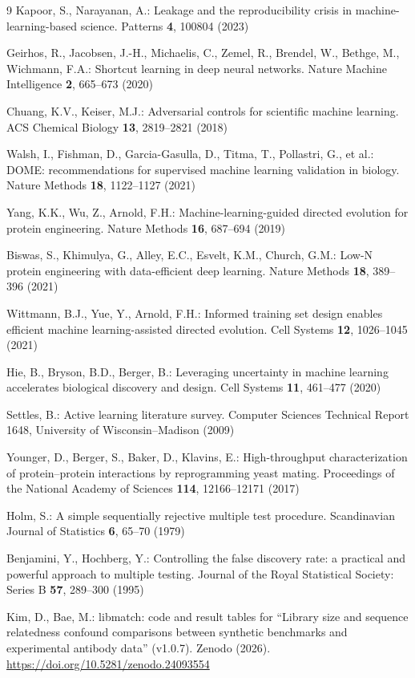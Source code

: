 \documentclass[pdflatex,sn-nature]{sn-jnl}
\theoremstyle{thmstyleone}
\theoremstyle{thmstyletwo}
\theoremstyle{thmstylethree}
\begin{document}
\begin{thebibliography}{9}
Kapoor, S., Narayanan, A.: Leakage and the reproducibility crisis in
machine-learning-based science. Patterns \textbf{4}, 100804 (2023)

Geirhos, R., Jacobsen, J.-H., Michaelis, C., Zemel, R., Brendel, W., Bethge,
M., Wichmann, F.A.: Shortcut learning in deep neural networks. Nature Machine
Intelligence \textbf{2}, 665--673 (2020)

Chuang, K.V., Keiser, M.J.: Adversarial controls for scientific machine
learning. ACS Chemical Biology \textbf{13}, 2819--2821 (2018)

Walsh, I., Fishman, D., Garcia-Gasulla, D., Titma, T., Pollastri, G., et al.:
DOME: recommendations for supervised machine learning validation in biology.
Nature Methods \textbf{18}, 1122--1127 (2021)

Yang, K.K., Wu, Z., Arnold, F.H.: Machine-learning-guided directed evolution
for protein engineering. Nature Methods \textbf{16}, 687--694 (2019)

Biswas, S., Khimulya, G., Alley, E.C., Esvelt, K.M., Church, G.M.: Low-N
protein engineering with data-efficient deep learning. Nature Methods
\textbf{18}, 389--396 (2021)

Wittmann, B.J., Yue, Y., Arnold, F.H.: Informed training set design enables
efficient machine learning-assisted directed evolution. Cell Systems
\textbf{12}, 1026--1045 (2021)

Hie, B., Bryson, B.D., Berger, B.: Leveraging uncertainty in machine learning
accelerates biological discovery and design. Cell Systems \textbf{11},
461--477 (2020)

Settles, B.: Active learning literature survey. Computer Sciences Technical
Report 1648, University of Wisconsin--Madison (2009)

Younger, D., Berger, S., Baker, D., Klavins, E.: High-throughput
characterization of protein--protein interactions by reprogramming yeast
mating. Proceedings of the National Academy of Sciences \textbf{114},
12166--12171 (2017)

Holm, S.: A simple sequentially rejective multiple test procedure.
Scandinavian Journal of Statistics \textbf{6}, 65--70 (1979)

Benjamini, Y., Hochberg, Y.: Controlling the false discovery rate: a practical
and powerful approach to multiple testing. Journal of the Royal Statistical
Society: Series B \textbf{57}, 289--300 (1995)

Kim, D., Bae, M.: libmatch: code and result tables for ``Library size and
sequence relatedness confound comparisons between synthetic benchmarks and
experimental antibody data'' (v1.0.7). Zenodo (2026).
\url{https://doi.org/10.5281/zenodo.24093554}

\end{thebibliography}
\end{document}
